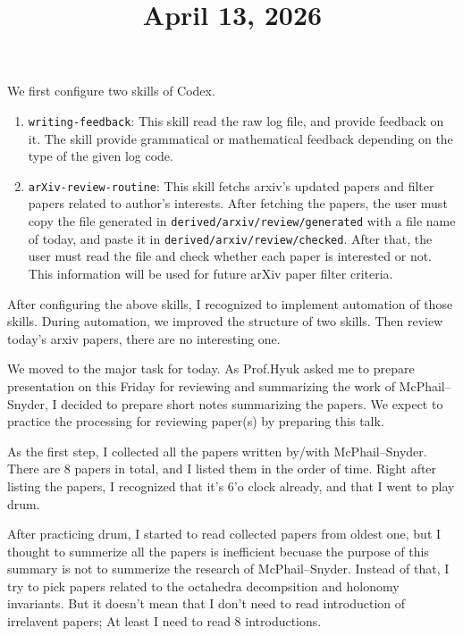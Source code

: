 \documentclass[11pt]{amsart}
\title{April 13, 2026}
\begin{document}
\maketitle

We first configure two skills of Codex.

\begin{enumerate}
    \item \texttt{writing-feedback}: This skill read the raw log file, and provide feedback on it.
    The skill provide grammatical or mathematical feedback depending on the type of the given log code.
    \item \texttt{arXiv-review-routine}: This skill fetchs arxiv's updated papers and filter papers related to author's interests.
    After fetching the papers, the user must copy the file generated in \texttt{derived/arxiv/review/generated} with a file name of today, and paste it in \texttt{derived/arxiv/review/checked}.
    After that, the user must read the file and check whether each paper is interested or not.
    This information will be used for future arXiv paper filter criteria.
\end{enumerate}

After configuring the above skills, I recognized to implement automation of those skills.
During automation, we improved the structure of two skills.
Then review today's arxiv papers, there are no interesting one.
\par\vspace{1em}
We moved to the major task for today.
As Prof.Hyuk asked me to prepare presentation on this Friday for reviewing and summarizing the work of McPhail--Snyder, I decided to prepare short notes summarizing the papers.
We expect to practice the processing for reviewing paper(s) by preparing this talk.

As the first step, I collected all the papers written by/with McPhail--Snyder.
There are 8 papers in total, and I listed them in the order of time.
Right after listing the papers, I recognized that it's 6'o clock already, and that I went to play drum.

After practicing drum, I started to read collected papers from oldest one, but I thought to summerize all the papers is inefficient becuase the purpose of this summary is not to summerize the research of McPhail--Snyder.
Instead of that, I try to pick papers related to the octahedra decompsition and holonomy invariants.
But it doesn't mean that I don't need to read introduction of irrelavent papers; At least I need to read 8 introductions.

% 
% 
\end{document}
